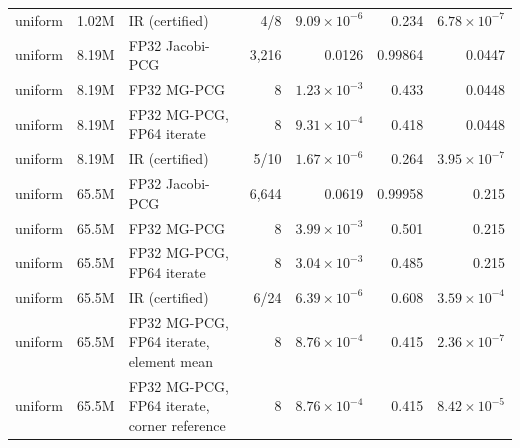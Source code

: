 \begin{tabular}{lllrrrr}
uniform & 1.02M & IR (certified) & 4/8 & $9.09\times10^{-6}$ & 0.234 & $6.78\times10^{-7}$ \\
uniform & 8.19M & FP32 Jacobi-PCG & 3{,}216 & 0.0126 & 0.99864 & 0.0447 \\
uniform & 8.19M & FP32 MG-PCG & 8 & $1.23\times10^{-3}$ & 0.433 & 0.0448 \\
uniform & 8.19M & FP32 MG-PCG, FP64 iterate & 8 & $9.31\times10^{-4}$ & 0.418 & 0.0448 \\
uniform & 8.19M & IR (certified) & 5/10 & $1.67\times10^{-6}$ & 0.264 & $3.95\times10^{-7}$ \\
uniform & 65.5M & FP32 Jacobi-PCG & 6{,}644 & 0.0619 & 0.99958 & 0.215 \\
uniform & 65.5M & FP32 MG-PCG & 8 & $3.99\times10^{-3}$ & 0.501 & 0.215 \\
uniform & 65.5M & FP32 MG-PCG, FP64 iterate & 8 & $3.04\times10^{-3}$ & 0.485 & 0.215 \\
uniform & 65.5M & IR (certified) & 6/24 & $6.39\times10^{-6}$ & 0.608 & $3.59\times10^{-4}$ \\
uniform & 65.5M & FP32 MG-PCG, FP64 iterate, element mean & 8 & $8.76\times10^{-4}$ & 0.415 & $2.36\times10^{-7}$ \\
uniform & 65.5M & FP32 MG-PCG, FP64 iterate, corner reference & 8 & $8.76\times10^{-4}$ & 0.415 & $8.42\times10^{-5}$ \\
\bottomrule
\end{tabular}
